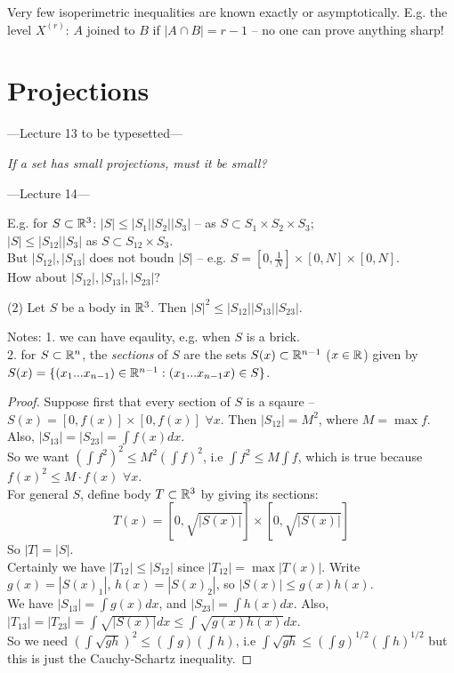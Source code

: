 \documentclass[a4paper]{article}
\begin{document}
Very few isoperimetric inequalities are known exactly or asymptotically. E.g. the level $X^{(r)}$: $A$ joined to $B$ if $|A \cap B| = r-1$ -- no one can prove anything sharp!

\newpage

\section{Projections}

---Lecture 13 to be typesetted---

\emph{If a set has small projections, must it be small?}

---Lecture 14---

E.g. for $S \subset \mathbb{R}^3$: $|S| \leq |S_1| |S_2| |S_3|$ -- as $S \subset S_1 \times S_2 \times S_3$;\\
$|S| \leq |S_{12}| |S_3|$ as $S \subset S_{12} \times S_3$.\\
But $|S_{12}|,|S_{13}|$ does not boudn $|S|$ -- e.g. $S=[0,\frac{1}{N}] \times [0,N] \times [0,N]$.\\
How about $|S_{12}|,|S_{13}|,|S_{23}|$?

\begin{prop} (2)
    Let $S$ be a body in $\mathbb{R}^3$. Then $|S|^2 \leq |S_{12}||S_{13}||S_{23}|$.

    Notes: 1. we can have eqaulity, e.g. when $S$ is a brick.\\
    2. for $S \subset \mathbb{R}^n$, the \emph{sections} of $S$ are the sets $S(x) \subset \mathbb{R}^{n-1}$ ($x \in \mathbb{R}$) given by $S(x) = \{(x_1...x_{n-1}) \in \mathbb{R}^{n-1}:(x_1...x_{n-1}x) \in S\}$.

    \begin{proof}
        Suppose first that every section of $S$ is a sqaure -- $S(x) =[0,f(x)] \times [0,f(x)]$ $\forall x$. Then $|S_{12}| = M^2$, where $M=\max f$. Also, $|S_{13}| = |S_{23}| = \int f(x) dx$.\\
        So we want $(\int f^2)^2 \leq M^2 (\int f)^2$, i.e $\int f^2 \leq M \int f$, which is true because $f(x)^2 \leq M \cdot f(x)$ $\forall x$.\\
        For general $S$, define body $T \subset \mathbb{R}^3$ by giving its sections:
        $$T(x) = [0,\sqrt{|S(x)|}] \times [0,\sqrt{|S(x)|}]$$
        So $|T| = |S|$.\\
        Certainly we have $|T_{12}| \leq |S_{12}|$ since $|T_{12}| = \max |T(x)|$. Write $g(x) = |S(x)_1|$, $h(x) = |S(x)_2|$, so $|S(x)| \leq g(x)h(x)$.\\
        We have $|S_{13}| = \int g(x) dx$, and $|S_{23}| = \int h(x) dx$. Also, $|T_{13}| = |T_{23}| = \int \sqrt{|S(x)|} dx \leq \int \sqrt{g(x)h(x)} dx$.\\
        So we need $(\int \sqrt{gh})^2 \leq (\int g)(\int h)$, i.e $\int \sqrt{gh} \leq (\int g)^{1/2} (\int h)^{1/2}$ but this is just the Cauchy-Schartz inequality.
    \end{proof}
\end{prop}
\end{document}
